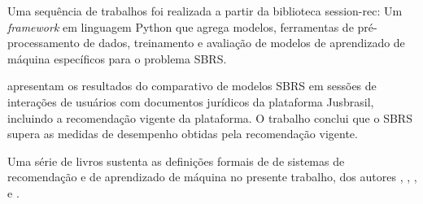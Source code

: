 Uma sequência de trabalhos
\cite{LATIFI_2021,ludewig2021empirical,ludewig_2018,ludewig_2019,sessionrec} foi
realizada a partir da biblioteca session-rec: Um \textit{framework} em linguagem
Python que agrega modelos, ferramentas de pré-processamento de dados,
treinamento e avaliação de modelos de aprendizado de máquina específicos para o
problema SBRS.

 \citet{jusbrasil2022} apresentam os resultados do comparativo de modelos SBRS em
sessões de interações de usuários com documentos jurídicos da plataforma
Jusbrasil, incluindo a recomendação vigente da plataforma. O trabalho
conclui que o SBRS supera as medidas de desempenho obtidas pela recomendação
vigente.

Uma série de livros sustenta as definições formais de de sistemas de
recomendação e de aprendizado de máquina no presente trabalho, dos autores
\citet{pml1Book}, \citet{jannach2011recommender}, \citet{ricci2010introduction},
\citet{mitchell1997} e \citet{aggarwal2016recommender}.